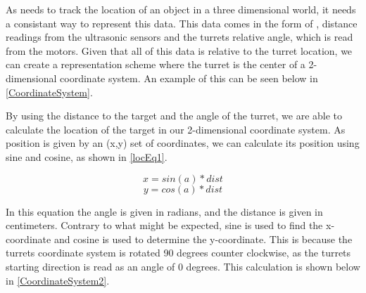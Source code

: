 \label{RepScheme}
As \name needs to track the location of an object in a three dimensional world,
it needs a consistant way to represent this data. This data comes in the form
of , distance readings from the ultrasonic sensors and the turrets relative
angle, which is read from the motors. Given that all of this data is relative to the turret location, we can create a representation
scheme where the turret is the center of a 2-dimensional coordinate system. An
example of this can be seen below in \autoref{CoordinateSystem}.\nl


By using the distance to the target and the angle of the turret, we are able to
calculate the location of the target in our 2-dimensional coordinate system.
As position is given by an (x,y) set of coordinates, we can calculate its
position using sine and cosine, as shown in \autoref{locEq1}.

\begin{equation}\label{locEq1}
x=sin(a)*dist
\end{equation}
\begin{equation}\label{locEq2}
y=cos(a)*dist
\end{equation} 

In this equation the angle  is given in radians, and the distance
 is given in centimeters. Contrary to what might be expected, sine
is used to find the x-coordinate and cosine is used to determine the
y-coordinate. This is because the turrets coordinate system is rotated 90
degrees counter clockwise, as the turrets starting direction is read as an angle
of 0 degrees. This calculation is shown below in \autoref{CoordinateSystem2}.


